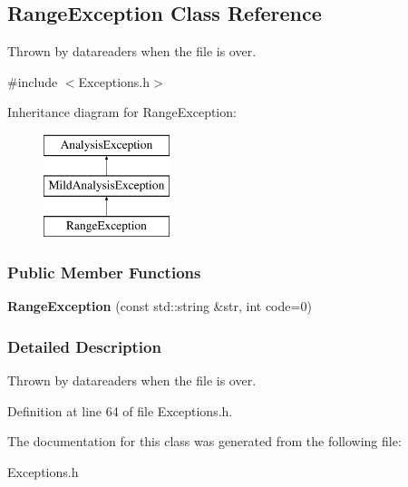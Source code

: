\hypertarget{classRangeException}{
\subsection{RangeException Class Reference}
\label{classRangeException}
}


Thrown by datareaders when the file is over.  




{\ttfamily \#include $<$Exceptions.h$>$}

Inheritance diagram for RangeException:\begin{figure}[H]
\begin{center}
\leavevmode
\includegraphics[height=3.000000cm]{classRangeException}
\end{center}
\end{figure}
\subsubsection*{Public Member Functions}
\begin{DoxyCompactItemize}
\item 
\hypertarget{classRangeException_ab269c15c3285c9403089ca022304a809}{
{\bfseries RangeException} (const std::string \&str, int code=0)}
\label{classRangeException_ab269c15c3285c9403089ca022304a809}

\end{DoxyCompactItemize}


\subsubsection{Detailed Description}
Thrown by datareaders when the file is over. 

Definition at line 64 of file Exceptions.h.



The documentation for this class was generated from the following file:\begin{DoxyCompactItemize}
\item 
Exceptions.h\end{DoxyCompactItemize}
